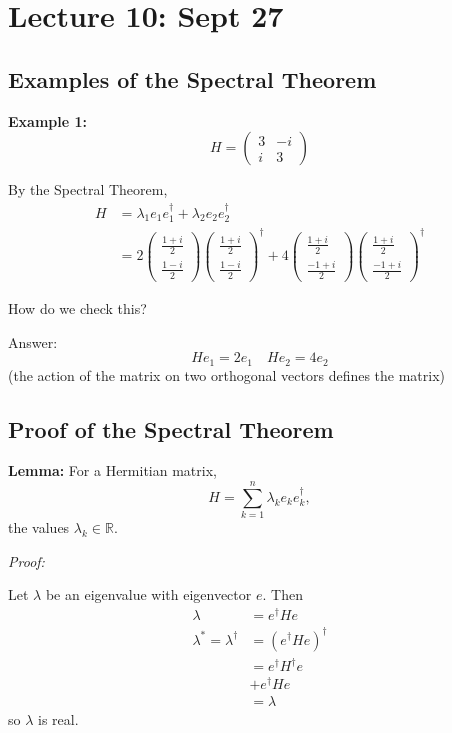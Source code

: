 \documentclass[12pt]{article}
\newcommand{\R}{\mathbb{R}}
\begin{document}
\section*{Lecture 10: Sept 27}
\subsection*{Examples of the Spectral Theorem}
\textbf{Example 1:}
\[H = \begin{pmatrix}
    3 & -i\\
    i & 3
\end{pmatrix}\]

By the Spectral Theorem,
\begin{align*}
    H &= \lambda_1 e_1 e_1^\dagger + \lambda_2 e_2 e_2^\dagger\\
    &= 2\begin{pmatrix}
        \frac{1 + i}{2}\\
        \frac{1 - i}{2}
    \end{pmatrix}\begin{pmatrix}
        \frac{1 + i}{2}\\
        \frac{1 - i}{2}
    \end{pmatrix}^\dagger + 4\begin{pmatrix}
        \frac{1 + i}{2}\\
        \frac{-1 + i}{2}
    \end{pmatrix}\begin{pmatrix}
        \frac{1 + i}{2}\\
        \frac{-1 + i}{2}
    \end{pmatrix}^\dagger
\end{align*}

How do we check this? 

Answer:
\[He_1 = 2e_1 \quad He_2 = 4e_2\]
(the action of the matrix on two orthogonal vectors defines the matrix)

\subsection*{Proof of the Spectral Theorem}
\textbf{Lemma:} For a Hermitian matrix,
\[H = \sum_{k=1}^n \lambda_k e_k e_k^\dagger,\]
the values $\lambda_k \in \R$.

\emph{Proof:}

Let $\lambda$ be an eigenvalue with eigenvector $e$. Then 
\begin{align*}
    \lambda &= e^\dagger He\\
    \lambda^* = \lambda^\dagger &= (e^\dagger He)^\dagger\\
    &= e^\dagger H^\dagger e\\
    &+ e^\dagger He\\
    &= \lambda
\end{align*}
so $\lambda$ is real. 
\end{document}
